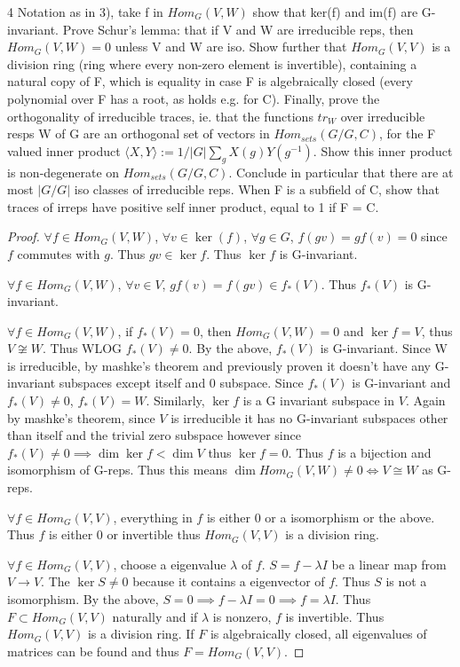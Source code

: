 \documentclass{article}
\newcommand{\angles}[1]{\langle #1 \rangle}
\begin{document}
\begin{PROB}{4}\label{Problem 4.}
    Notation as in 3), take f in $Hom_G(V,W)$ show that ker(f) and im(f) are G-invariant. Prove Schur's lemma: that if V and W are irreducible reps, then $Hom_G(V,W) =0$ unless V and W are iso. Show further that $Hom_G(V,V)$ is a division ring (ring where every non-zero element is invertible), containing a natural copy of F, which is equality in case F is algebraically closed (every polynomial over F has a root, as holds e.g. for C). Finally, prove the orthogonality of irreducible traces, ie. that the functions $tr_W$ over irreducible resps W of G are an orthogonal set of vectors in $Hom_{sets}(G/G,C)$, for the F valued inner product $\angles{X,Y} := 1/|G| \sum_g X(g) Y(g^{-1})$. Show this inner product is non-degenerate on $Hom_{sets}(G/G,C)$. Conclude in particular that there are at most $|G/G|$ iso classes of irreducible reps. When F is a subfield of C, show that traces of irreps have positive self inner product, equal to 1 if F = C.
\end{PROB}
\begin{proof}
    $\forall f \in Hom_G(V, W)$, $\forall v \in \ker(f)$, $\forall g \in G$, $f(gv) = gf(v) = 0$ since $f$ commutes with $g$. Thus $gv \in \ker f$. Thus $\ker f$ is G-invariant. 
    
    $\forall f \in Hom_G(V, W)$, $\forall v \in V$,   $gf(v) = f(gv) \in f_*(V)$. Thus $f_*(V)$ is G-invariant. 
    
    $\forall f \in Hom_G(V, W)$, if $f_*(V) = 0$, then $Hom_G(V, W) = 0$ and $\ker f = V$, thus $V \not \cong W$. Thus WLOG $f_*(V) \neq 0$. By the above, $f_*(V)$ is G-invariant. Since W is irreducible, by mashke's theorem and previously proven it doesn't have any G-invariant subspaces except itself and 0 subspace. Since $f_*(V)$ is G-invariant and $f_*(V) \neq 0$, $f_*(V) =W$. Similarly, $\ker f$ is a G invariant subspace in $V$. Again by mashke's theorem, since $V$ is irreducible it has no G-invariant subspaces other than itself and the trivial zero subspace however since $f_*(V) \neq 0 \implies \dim \ker f < \dim V$ thus $\ker f = 0$. Thus $f$ is a bijection and isomorphism of G-reps. Thus this means $\dim Hom_G(V, W) \neq 0 \iff V \cong W$ as G-reps.     
    
    $\forall f \in Hom_G(V, V)$, everything in $f$ is either 0 or a isomorphism or the above. Thus $f$ is either 0 or invertible thus $Hom_G(V, V)$ is a division ring.     

    $\forall f \in Hom_G(V, V)$, choose a eigenvalue $\lambda$ of $f$. $S = f - \lambda I$ be a linear map from $V \to V$. The $\ker S \neq 0$ because it contains a eigenvector of $f$. Thus $S$ is not a isomorphism. By the above, $S = 0 \implies f -\lambda I = 0\implies f = \lambda I$. Thus $F \subset Hom_G(V, V)$ naturally and if $\lambda$ is nonzero, $f$ is invertible. Thus $Hom_G(V, V)$ is a division ring. If $F$ is algebraically closed, all eigenvalues of matrices can be found and thus $F = Hom_G(V, V)$.               
\end{proof}
\end{document}
